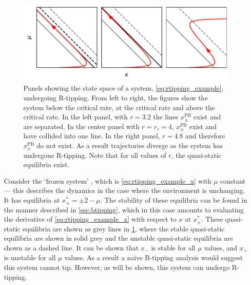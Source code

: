 \begin{figure}
  \centering
  \includegraphics[width=\textwidth,keepaspectratio]{rate}
  \caption[R-tipping mechanism]{Panels showing the state space of a system, \cref{eq:rtipping_example}, undergoing R-tipping.
    From left to right, the figures show the system below the critical rate, at the critical rate and above the critical rate. In the left panel, with $r=3.2$ the lines
    $x^{\mathrm{PB}}_{\pm}$ exist and are separated. In the center panel with $r = r_c = 4$, $x^{\mathrm{PB}}_{\pm}$ exist and have collided into one line. In the right panel,
    $r = 4.8$ and therefore $x^{\mathrm{PB}}_{\pm}$ do not exist. As a result trajectories diverge as the system has undergone R-tipping. Note that for all values of $r$, the
    quasi-static equilibria exist.}
  \label{fig:rate_tipping}
\end{figure}

Consider the `frozen system' \parencite{Wieczorek2021}, which is \cref{eq:rtipping_example_x} with $\mu$ constant --- this describes the dynamics
in the case where the environment is unchanging. It has equilibria at
$x^*_{\pm} = \pm 2 - \mu$. The stability of these equilibria can be found in the manner described in \cref{sec:btipping}, which in this case amounts to evaluating
the derivative of \cref{eq:rtipping_example_x} with respect to $x$ at $x^*_{\pm}$. These quasi-static equilibria are shown as grey lines in \cref{fig:rate_tipping}, where
the stable quasi-static equilibria are shown in solid grey and the unstable quasi-static equilibria are shown as a dashed line.
It can be shown that $x_-$ is stable for all $\mu$ values, and $x_+$ is unstable for all $\mu$ values. As a result a na{\"i}ve B-tipping analysis
would suggest this system cannot tip. However, as will be shown, this system can undergo R-tipping.

